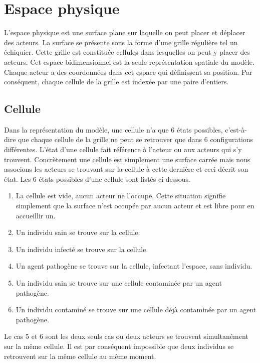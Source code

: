 \section{Espace physique}

L'espace physique est une surface plane sur laquelle on peut placer et déplacer des acteurs. La surface se présente sous la forme d'une grille régulière tel un échiquier. Cette grille est constituée cellules dans lesquelles on peut y placer des acteurs. Cet espace bidimensionnel est la seule représentation spatiale du modèle. Chaque acteur a des coordonnées dans cet espace qui définissent sa position. Par conséquent, chaque cellule de la grille est indexée par une paire d'entiers.

\subsection{Cellule}

Dans la représentation du modèle, une cellule n'a que $6$ états possibles, c'est-à-dire que chaque cellule de la grille ne peut se retrouver que dans $6$ configurations différentes. L'état d'une cellule fait référence à l'acteur ou aux acteurs qui s'y trouvent. Concrètement une cellule est simplement une surface carrée mais nous associons les acteurs se trouvant sur la cellule à cette dernière et ceci décrit son état. Les $6$ états possibles d'une cellule sont listés ci-dessous.

\begin{enumerate}
	\item La cellule est vide, aucun acteur ne l'occupe. Cette situation signifie simplement que la surface n'est occupée par aucun acteur et est libre pour en accueillir un.
	\item Un individu sain se trouve sur la cellule.
	\item Un individu infecté se trouve sur la cellule.
	\item Un agent pathogène se trouve sur la cellule, infectant l'espace, sans individu.
	\item Un individu sain se trouve sur une cellule contaminée par un agent pathogène.
	\item Un individu contaminé se trouve sur une cellule déjà contaminée par un agent pathogène.
\end{enumerate}

Le cas $5$ et $6$ sont les deux seuls cas ou deux acteurs se trouvent simultanément sur la même cellule. Il est par conséquent impossible que deux individus se retrouvent sur la même cellule au même moment.

